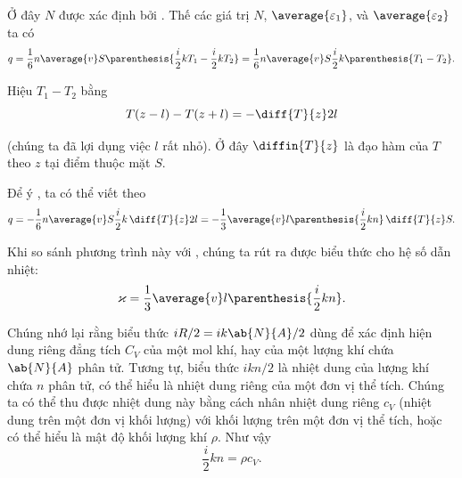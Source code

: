 \noindent
Ở đây $N$ được xác định bởi . Thế các giá trị $N$, $\average{\varepsilon_1}$, và $\average{\varepsilon_2}$ ta có
\begin{equation}\label{eq:16_21}
    q = \frac{1}{6} n\average{v} S \parenthesis{\frac{i}{2}kT_1 - \frac{i}{2}kT_2} = \frac{1}{6} n\average{v} S \frac{i}{2} k\parenthesis{T_1-T_2}.
\end{equation}

\noindent
Hiệu $T_1-T_2$ bằng
\begin{equation}\label{eq:16_22}
    T (z-l) - T (z+l) = -\diff{T}{z} 2l
\end{equation}

\noindent
(chúng ta đã lợi dụng việc $l$ rất nhỏ). Ở đây $\diffin{T}{z}$ là đạo hàm của $T$ theo $z$ tại điểm thuộc mặt $S$.

Để ý , ta có thể viết  theo
\begin{equation}\label{eq:16_23}
    q = -\frac{1}{6} n\average{v} S \frac{i}{2}k\,\diff{T}{z} 2l = -\frac{1}{3} \average{v} l \parenthesis{\frac{i}{2}kn}\,\diff{T}{z} S.
\end{equation}

\noindent
Khi so sánh phương trình này với , chúng ta rút ra được biểu thức cho hệ số dẫn nhiệt: 
\begin{equation}\label{eq:16_24}
    \varkappa = \frac{1}{3} \average{v} l \parenthesis{\frac{i}{2}kn}.
\end{equation}

Chúng nhớ lại rằng biểu thức $iR/2=ik\ab{N}{A}/2$ dùng để xác định hiện dung riêng đẳng tích $C_V$ của một mol khí, hay của một lượng khí chứa $\ab{N}{A}$ phân tử. Tương tự, biểu thức $ikn/2$ là nhiệt dung của lượng khí chứa $n$ phân tử, có thể hiểu là nhiệt dung riêng của một đơn vị thể tích. Chúng ta có thể thu được nhiệt dung này bằng cách nhân nhiệt dung riêng $c_V$ (nhiệt dung trên một đơn vị khối lượng) với khối lượng trên một đơn vị thể tích, hoặc có thể hiểu là mật độ khối lượng khí $\rho$. Như vậy
\begin{equation}\label{eq:16_25}
    \frac{i}{2}kn = \rho c_V.
\end{equation}

